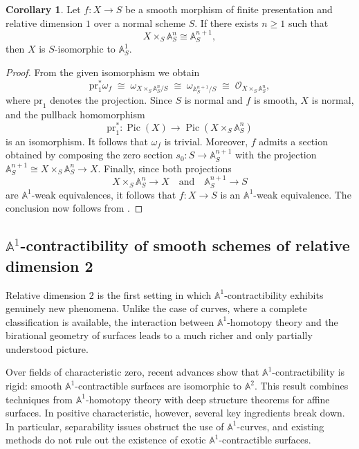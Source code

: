\documentclass[10pt]{amsart}
\renewcommand{\AA}{\mathbb{A}}
\numberwithin{equation}{section} %
\theoremstyle{plain}
\theoremstyle{definition}
\newtheorem{corollary}[corollary]{Corollary}
\theoremstyle{remark}
\newcommand{\Pic}{\operatorname{Pic}}
\begin{document}
\begin{corollary}
Let $f:X\to S$ be a smooth morphism of finite presentation and relative dimension $1$ over a normal scheme $S$. If there exists $n\geq 1$ such that
\[
X\times_S \AA^n_S \cong \AA^{n+1}_S,
\]
then $X$ is $S$-isomorphic to $\AA^1_S$.
\end{corollary}

\begin{proof}
From the given isomorphism we obtain
\[
\mathrm{pr}_1^*\omega_f
\;\cong\;
\omega_{X\times_S \AA^n_S/S}
\;\cong\;
\omega_{\AA^{n+1}_S/S}
\;\cong\;
\mathcal{O}_{X\times_S \AA^n_S},
\]
where $\mathrm{pr}_1$ denotes the projection. Since $S$ is normal and $f$ is smooth, $X$ is normal, and the pullback homomorphism
\[
\mathrm{pr}_1^*:\Pic(X)\to \Pic(X\times_S \AA^n_S)
\]
is an isomorphism. It follows that $\omega_f$ is trivial. Moreover, $f$ admits a section obtained by composing the zero section $s_0:S\to \AA^{n+1}_S$ with the projection $\AA^{n+1}_S\cong X\times_S \AA^n_S\to X$. Finally, since both projections
\[
X\times_S \AA^n_S\to X
\quad\text{and}\quad
\AA^{n+1}_S\to S
\]
are $\AA^1$-weak equivalences, it follows that $f:X\to S$ is an $\AA^1$-weak equivalence. The conclusion now follows from .
\end{proof}








\subsection{\texorpdfstring{$\AA^1$}{A1}-contractibility of smooth schemes of relative dimension 2}
\label{Sect:2-dim schemes}

Relative dimension $2$ is the first setting in which $\AA^1$-contractibility exhibits genuinely new phenomena. Unlike the case of curves, where a complete classification is available, the interaction between $\AA^1$-homotopy theory and the birational geometry of surfaces leads to a much richer and only partially understood picture.
\medskip

Over fields of characteristic zero, recent advances show that $\AA^1$-contractibility is rigid: smooth $\AA^1$-contractible surfaces are isomorphic to $\AA^2$. This result combines techniques from $\AA^1$-homotopy theory with deep structure theorems for affine surfaces.
In positive characteristic, however, several key ingredients break down. In particular, separability issues obstruct the use of $\AA^1$-curves, and existing methods do not rule out the existence of exotic $\AA^1$-contractible surfaces. 
\medskip
\end{document}
